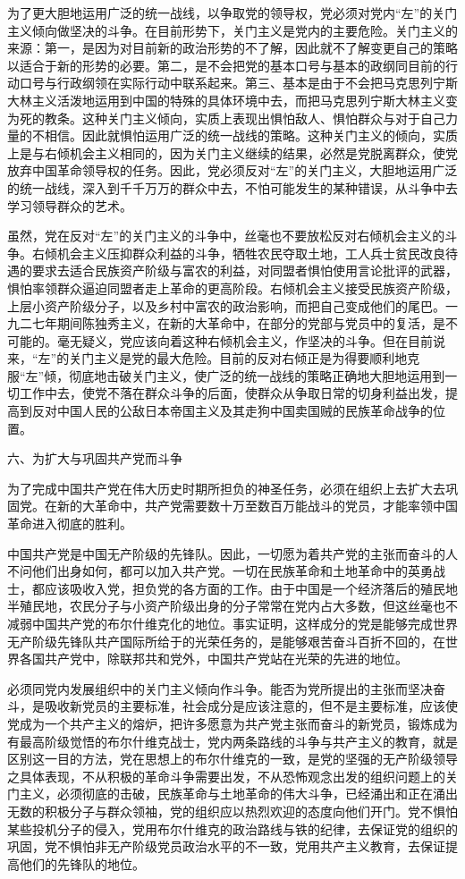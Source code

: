 为了更大胆地运用广泛的统一战线，以争取党的领导权，党必须对党内“左”的关门主义倾向做坚决的斗争。在目前形势下，关门主义是党内的主要危险。关门主义的来源：第一，是因为对目前新的政治形势的不了解，因此就不了解变更自己的策略以适合于新的形势的必要。第二，是不会把党的基本口号与基本的政纲同目前的行动口号与行政纲领在实际行动中联系起来。第三、基本是由于不会把马克思列宁斯大林主义活泼地运用到中国的特殊的具体环境中去，而把马克思列宁斯大林主义变为死的教条。这种关门主义倾向，实质上表现出惧怕敌人、惧怕群众与对于自己力量的不相信。因此就惧怕运用广泛的统一战线的策略。这种关门主义的倾向，实质上是与右倾机会主义相同的，因为关门主义继续的结果，必然是党脱离群众，使党放弃中国革命领导权的任务。因此，党必须反对“左”的关门主义，大胆地运用广泛的统一战线，深入到千千万万的群众中去，不怕可能发生的某种错误，从斗争中去学习领导群众的艺术。

虽然，党在反对“左”的关门主义的斗争中，丝毫也不要放松反对右倾机会主义的斗争。右倾机会主义压抑群众利益的斗争，牺牲农民夺取土地，工人兵士贫民改良待遇的要求去适合民族资产阶级与富农的利益，对同盟者惧怕使用言论批评的武器，惧怕率领群众逼迫同盟者走上革命的更高阶段。右倾机会主义接受民族资产阶级，上层小资产阶级分子，以及乡村中富农的政治影响，而把自己变成他们的尾巴。一九二七年期间陈独秀主义，在新的大革命中，在部分的党部与党员中的复活，是不可能的。毫无疑义，党应该向着这种右倾机会主义，作坚决的斗争。但在目前说来，“左”的关门主义是党的最大危险。目前的反对右倾正是为得要顺利地克服“左”倾，彻底地击破关门主义，使广泛的统一战线的策略正确地大胆地运用到一切工作中去，使党不落在群众斗争的后面，使群众从争取日常的切身利益出发，提高到反对中国人民的公敌日本帝国主义及其走狗中国卖国贼的民族革命战争的位置。

六、为扩大与巩固共产党而斗争

为了完成中国共产党在伟大历史时期所担负的神圣任务，必须在组织上去扩大去巩固党。在新的大革命中，共产党需要数十万至数百万能战斗的党员，才能率领中国革命进入彻底的胜利。

中国共产党是中国无产阶级的先锋队。因此，一切愿为着共产党的主张而奋斗的人不问他们出身如何，都可以加入共产党。一切在民族革命和土地革命中的英勇战士，都应该吸收入党，担负党的各方面的工作。由于中国是一个经济落后的殖民地半殖民地，农民分子与小资产阶级出身的分子常常在党内占大多数，但这丝毫也不减弱中国共产党的布尔什维克化的地位。事实证明，这样成分的党是能够完成世界无产阶级先锋队共产国际所给于的光荣任务的，是能够艰苦奋斗百折不回的，在世界各国共产党中，除联邦共和党外，中国共产党站在光荣的先进的地位。

必须同党内发展组织中的关门主义倾向作斗争。能否为党所提出的主张而坚决奋斗，是吸收新党员的主要标准，社会成分是应该注意的，但不是主要标准，应该使党成为一个共产主义的熔炉，把许多愿意为共产党主张而奋斗的新党员，锻炼成为有最高阶级觉悟的布尔什维克战士，党内两条路线的斗争与共产主义的教育，就是区别这一目的方法，党在思想上的布尔什维克的一致，是党的坚强的无产阶级领导之具体表现，不从积极的革命斗争需要出发，不从恐怖观念出发的组织问题上的关门主义，必须彻底的击破，民族革命与土地革命的伟大斗争，已经涌出和正在涌出无数的积极分子与群众领袖，党的组织应以热烈欢迎的态度向他们开门。党不惧怕某些投机分子的侵入，党用布尔什维克的政治路线与铁的纪律，去保证党的组织的巩固，党不惧怕非无产阶级党员政治水平的不一致，党用共产主义教育，去保证提高他们的先锋队的地位。

